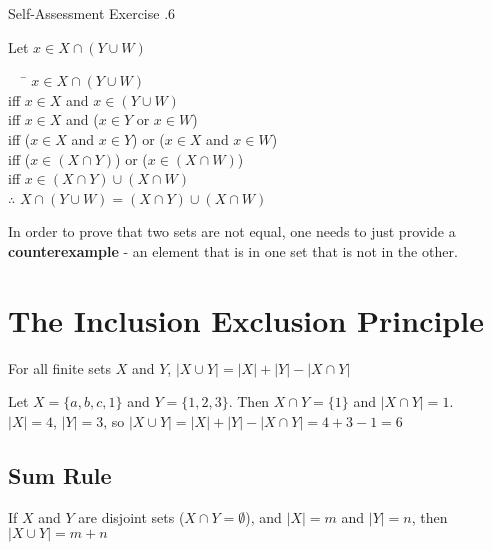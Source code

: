 \documentclass[../notes.tex]{subfiles}
\begin{document}
\begin{exercisebox}{Self-Assessment Exercise \thechapter.6}
\begin{enumerate}[label=(\alph*)]
						Let $x \in X \cap (Y \cup W)$
						\begin{tabbing}
							$\quad$ \= $x \in X \cap (Y \cup W)$\\
							iff \> $x \in X$ and $x \in (Y \cup W)$\\
							iff \> $x \in X$ and ($x \in Y$ or $x \in W$)\\
							iff \> ($x \in X$ and $x \in Y$) or ($x \in X$ and $x \in W$)\\
							iff \> ($x \in (X \cap Y)$) or ($x \in (X \cap W)$)\\
							iff \> $x \in (X \cap Y) \cup (X \cap W)$\\
							$\therefore$ \> $X \cap (Y \cup W) = (X \cap Y) \cup (X \cap W)$
						\end{tabbing}
				\end{enumerate}
			\end{exercisebox}
			In order to prove that two sets are not equal, one needs to just provide a \textbf{counterexample} - an element that is in one set that is not in the other.
		\section{The Inclusion Exclusion Principle}
			For all finite sets $X$ and $Y$, $\left\lvert X \cup Y\right\rvert = \left\lvert X\right\rvert + \left\lvert Y \right\rvert - \left\lvert X \cap Y\right\rvert $
			\begin{examplebox}
				Let $X = \{a, b, c, 1\}$ and $Y = \{1, 2, 3\}$. Then $X \cap Y = \{1\}$ and $\left\lvert X \cap Y\right\rvert = 1$.\\
				$\left\lvert X\right\rvert = 4$, $\left\lvert Y\right\rvert = 3$, so $\left\lvert X \cup Y\right\rvert = \left\lvert X\right\rvert + \left\lvert Y\right\rvert - \left\lvert X \cap Y\right\rvert = 4 + 3 - 1 = 6$
			\end{examplebox}
			\subsection{Sum Rule}
				If $X$ and $Y$ are disjoint sets ($X \cap Y = \emptyset$), and $\left\lvert X\right\rvert = m$ and $\left\lvert Y\right\rvert = n $, then $\left\lvert X \cup Y\right\rvert = m + n $
\end{document}
